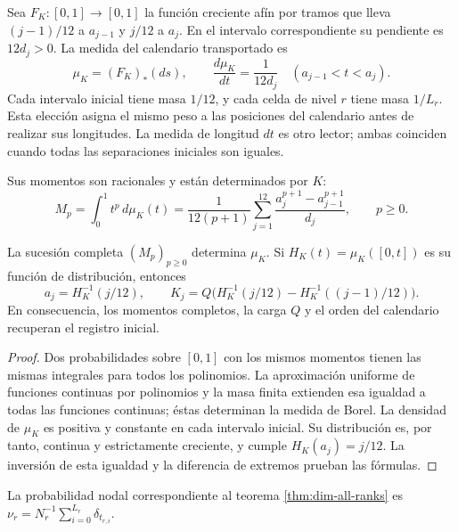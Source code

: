 Sea \(F_K:[0,1]\to[0,1]\) la función creciente afín por tramos
que lleva \((j-1)/12\) a \(a_{j-1}\) y \(j/12\) a \(a_j\).
En el intervalo correspondiente su pendiente es \(12d_j>0\).
La medida del calendario transportado es
\[
 \mu_K=(F_K)_*(ds),\qquad
 \frac{d\mu_K}{dt}=\frac1{12d_j}\quad
 (a_{j-1}<t<a_j).
\]
Cada intervalo inicial tiene masa \(1/12\), y cada celda de nivel
\(r\) tiene masa \(1/L_r\). Esta elección asigna el mismo peso
a las posiciones del calendario antes de realizar sus longitudes.
La medida de longitud \(dt\) es otro lector; ambas coinciden cuando
todas las separaciones iniciales son iguales.

Sus momentos son racionales y están determinados por \(K\):
\begin{equation}
 M_p=\int_0^1t^p\,d\mu_K(t)
   =\frac1{12(p+1)}\sum_{j=1}^{12}
       \frac{a_j^{p+1}-a_{j-1}^{p+1}}{d_j},\qquad p\geq0.
 \label{eq:dim-moments}
\end{equation}
\begin{proposition}
\label{prop:dim-moment-recovery}
La sucesión completa \((M_p)_{p\geq0}\) determina \(\mu_K\).
Si \(H_K(t)=\mu_K([0,t])\) es su función de distribución, entonces
\[
 a_j=H_K^{-1}(j/12),\qquad
 K_j=Q\bigl(H_K^{-1}(j/12)-H_K^{-1}((j-1)/12)\bigr).
\]
En consecuencia, los momentos completos, la carga \(Q\) y el orden
del calendario recuperan el registro inicial.
\end{proposition}
\begin{proof}
Dos probabilidades sobre \([0,1]\) con los mismos momentos tienen las
mismas integrales para todos los polinomios. La aproximación uniforme
de funciones continuas por polinomios y la masa finita extienden esa
igualdad a todas las funciones continuas; éstas determinan la medida
de Borel. La densidad de \(\mu_K\) es positiva y constante en cada
intervalo inicial. Su distribución es, por tanto, continua y
estrictamente creciente, y cumple \(H_K(a_j)=j/12\). La inversión
de esta igualdad y la diferencia de extremos prueban las fórmulas.
\end{proof}

La probabilidad nodal correspondiente al teorema
\ref{thm:dim-all-ranks} es
\(\nu_r=N_r^{-1}\sum_{i=0}^{L_r}\delta_{t_{r,i}}\).

